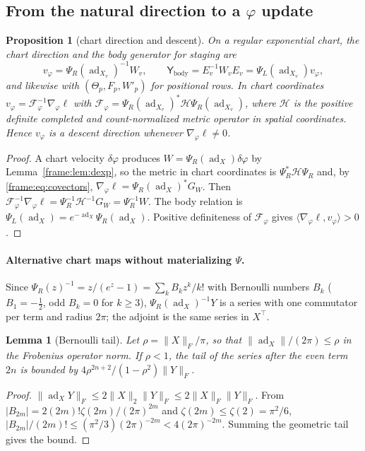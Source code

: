 \documentclass[11pt]{article}
\newtheorem{proposition}[theorem]{Proposition}
\newtheorem{lemma}[theorem]{Lemma}
\theoremstyle{definition}
\theoremstyle{remark}
\providecommand{\ad}{\operatorname{ad}}
\providecommand{\ip}[2]{\langle #1, #2\rangle}
\begin{document}
\subsection{From the natural direction to a \texorpdfstring{$\varphi$}{phi} update}\label{frame:sec:update}

\begin{proposition}[chart direction and descent]\label{frame:prop:descent}
On a regular exponential chart, the chart direction and the body generator for staging are
\begin{equation}\label{frame:eq:chartdir}
v_\varphi=\Psi_R(\ad_{X_v})^{-1}W_v,\qquad \mathsf{Y}_{\mathrm{body}}=E_v^{-1}W_vE_v=\Psi_L(\ad_{X_v})v_\varphi,
\end{equation}
and likewise with $(\Theta_p,F_p,W'_p)$ for positional rows. In chart coordinates $v_\varphi=\mathcal{F}_\varphi^{-1}\nabla_\varphi\ell$ with $\mathcal{F}_\varphi=\Psi_R(\ad_{X_v})^*\mathcal{H}\Psi_R(\ad_{X_v})$, where $\mathcal{H}$ is the positive definite completed and count-normalized metric operator in spatial coordinates. Hence $v_\varphi$ is a descent direction whenever $\nabla_\varphi\ell\neq0$.
\end{proposition}
\begin{proof}
A chart velocity $\delta\varphi$ produces $W=\Psi_R(\ad_X)\delta\varphi$ by Lemma~\ref{frame:lem:dexp}, so the metric in chart coordinates is $\Psi_R^*\mathcal{H}\Psi_R$ and, by \eqref{frame:eq:covectors}, $\nabla_\varphi\ell=\Psi_R(\ad_X)^*G_W$. Then $\mathcal{F}_\varphi^{-1}\nabla_\varphi\ell=\Psi_R^{-1}\mathcal{H}^{-1}G_W=\Psi_R^{-1}W$. The body relation is $\Psi_L(\ad_X)=e^{-\ad_X}\Psi_R(\ad_X)$. Positive definiteness of $\mathcal{F}_\varphi$ gives $\ip{\nabla_\varphi\ell}{v_\varphi}>0$.
\end{proof}

\paragraph{Alternative chart maps without materializing $\Psi$.} Since $\Psi_R(z)^{-1}=z/(e^z-1)=\sum_kB_kz^k/k!$ with Bernoulli numbers $B_k$ ($B_1=-\frac12$, odd $B_k=0$ for $k\ge3$), $\Psi_R(\ad_X)^{-1}Y$ is a series with one commutator per term and radius $2\pi$; the adjoint is the same series in $X^\top$.

\begin{lemma}[Bernoulli tail]\label{frame:lem:bernoulli}
Let $\rho=\|X\|_F/\pi$, so that $\|\ad_X\|/(2\pi)\le\rho$ in the Frobenius operator norm. If $\rho<1$, the tail of the series after the even term $2n$ is bounded by $4\rho^{2n+2}/(1-\rho^2)\|Y\|_F$.
\end{lemma}
\begin{proof}
$\|\ad_XY\|_F\le2\|X\|_2\|Y\|_F\le2\|X\|_F\|Y\|_F$. From $|B_{2m}|=2(2m)!\zeta(2m)/(2\pi)^{2m}$ and $\zeta(2m)\le\zeta(2)=\pi^2/6$, $|B_{2m}|/(2m)!\le(\pi^2/3)(2\pi)^{-2m}<4(2\pi)^{-2m}$. Summing the geometric tail gives the bound.
\end{proof}
\end{document}
